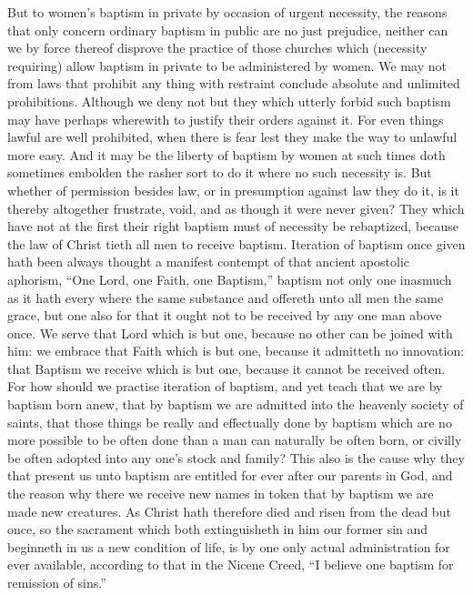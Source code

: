 But to women’s baptism in private by occasion of urgent necessity, the reasons that only concern ordinary baptism in public are no just prejudice, neither can we by force thereof disprove the practice of those churches which (necessity requiring) allow baptism in private to be administered by women. We may not from laws that prohibit any thing with restraint conclude absolute and unlimited prohibitions. Although we deny not but they which utterly forbid such baptism may have perhaps wherewith to justify their orders against it. For even things lawful are well prohibited,  when there is fear lest they make the way to unlawful more easy. And it may be the liberty of baptism by women at such times doth sometimes embolden the rasher sort to do it where no such necessity is.
But whether of permission besides law, or in presumption against law they do it, is it thereby altogether frustrate, void, and as though it were never given?
They which have not at the first their right baptism must of necessity be rebaptized, because the law of Christ tieth all men to receive baptism. Iteration of baptism once given hath been always thought a manifest contempt of that ancient apostolic aphorism, “One Lord, one Faith, one Baptism,” baptism not only one inasmuch as it hath every where the same substance and offereth unto all men the same grace, but one also for that it ought not to be received by any one man above once. We serve that Lord which is but one, because no other can be joined with him: we embrace that Faith which is but one, because it admitteth no innovation: that Baptism we receive which is but one, because it cannot be  received often. For how should we practise iteration of baptism, and yet teach that we are by baptism born anew, that by baptism we are admitted into the heavenly society of saints, that those things be really and effectually done by baptism which are no more possible to be often done than a man can naturally be often born, or civilly be often adopted into any one’s stock and family? This also is the cause why they that present us unto baptism are entitled for ever after our parents in God, and the reason why there we receive new names in token that by baptism we are made new creatures. As Christ hath therefore died and risen from the dead but once, so the sacrament which both extinguisheth in him our former sin and beginneth in us a new condition of life, is by one only actual administration for ever available, according to that in the Nicene Creed, “I believe one baptism for remission of sins.”
